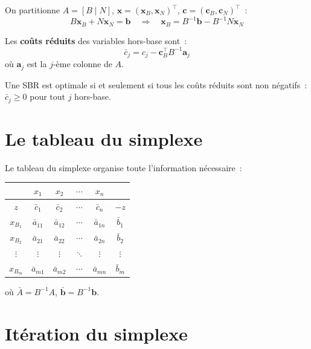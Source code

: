 On partitionne $A = [B \mid N]$, $\mathbf{x} = (\mathbf{x}_B, \mathbf{x}_N)^\top$,
$\mathbf{c} = (\mathbf{c}_B, \mathbf{c}_N)^\top$~:
\[
  B\mathbf{x}_B + N\mathbf{x}_N = \mathbf{b}
  \quad \Rightarrow \quad
  \mathbf{x}_B = B^{-1}\mathbf{b} - B^{-1}N\mathbf{x}_N
\]

\begin{definition}
Les \textbf{co\^uts r\'eduits} des variables hors-base sont~:
\[
  \bar{c}_j = c_j - \mathbf{c}_B^\top B^{-1} \mathbf{a}_j
\]
o\`u $\mathbf{a}_j$ est la $j$-\`eme colonne de $A$.
\end{definition}

\begin{theoreme}
\label{thm:optimalite_simplexe}
Une SBR est optimale si et seulement si tous les co\^uts r\'eduits sont
non n\'egatifs~: $\bar{c}_j \ge 0$ pour tout $j$ hors-base.
\end{theoreme}

\section{Le tableau du simplexe}

Le tableau du simplexe organise toute l'information n\'ecessaire~:

\begin{center}
\begin{tabular}{c|cccc|c}
  & $x_1$ & $x_2$ & $\cdots$ & $x_n$ & \\
  \toprule
  $z$ & $\bar{c}_1$ & $\bar{c}_2$ & $\cdots$ & $\bar{c}_n$ & $-z$ \\
  \midrule
  $x_{B_1}$ & $\bar{a}_{11}$ & $\bar{a}_{12}$ & $\cdots$ & $\bar{a}_{1n}$ & $\bar{b}_1$ \\
  $x_{B_2}$ & $\bar{a}_{21}$ & $\bar{a}_{22}$ & $\cdots$ & $\bar{a}_{2n}$ & $\bar{b}_2$ \\
  $\vdots$ & $\vdots$ & $\vdots$ & $\ddots$ & $\vdots$ & $\vdots$ \\
  $x_{B_m}$ & $\bar{a}_{m1}$ & $\bar{a}_{m2}$ & $\cdots$ & $\bar{a}_{mn}$ & $\bar{b}_m$ \\
\end{tabular}
\end{center}

o\`u $\bar{A} = B^{-1}A$, $\bar{\mathbf{b}} = B^{-1}\mathbf{b}$.

\section{It\'eration du simplexe}

